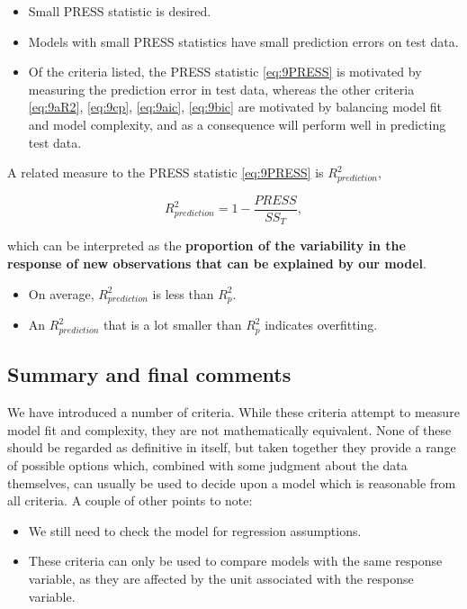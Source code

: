 \documentclass[
]{book}
\providecommand{\tightlist}{%
  \setlength{\itemsep}{0pt}\setlength{\parskip}{0pt}}
\begin{document}
\begin{itemize}
\tightlist
\item
  Small PRESS statistic is desired.
\item
  Models with small PRESS statistics have small prediction errors on test data.
\item
  Of the criteria listed, the PRESS statistic \eqref{eq:9PRESS} is motivated by measuring the prediction error in test data, whereas the other criteria \eqref{eq:9aR2}, \eqref{eq:9cp}, \eqref{eq:9aic}, \eqref{eq:9bic} are motivated by balancing model fit and model complexity, and as a consequence will perform well in predicting test data.
\end{itemize}

A related measure to the PRESS statistic \eqref{eq:9PRESS} is \(R^2_{prediction}\),

\begin{equation}
R^2_{prediction} = 1 - \frac{PRESS}{SS_T},
\label{eq:9R2pred}
\end{equation}

which can be interpreted as the \textbf{proportion of the variability in the response of new observations that can be explained by our model}.

\begin{itemize}
\tightlist
\item
  On average, \(R^2_{prediction}\) is less than \(R^2_p\).
\item
  An \(R^2_{prediction}\) that is a lot smaller than \(R^2_p\) indicates overfitting.
\end{itemize}

\hypertarget{summary-and-final-comments}{%
\subsection{Summary and final comments}\label{summary-and-final-comments}}

We have introduced a number of criteria. While these criteria attempt to measure model fit and complexity, they are not mathematically equivalent. None of these should be regarded as definitive in itself, but taken together
they provide a range of possible options which, combined with some
judgment about the data themselves, can usually be used to decide
upon a model which is reasonable from all criteria. A couple of other points to note:

\begin{itemize}
\tightlist
\item
  We still need to check the model for regression assumptions.
\item
  These criteria can only be used to compare models with the same response variable, as they are affected by the unit associated with the response variable.
\end{itemize}
\end{document}
